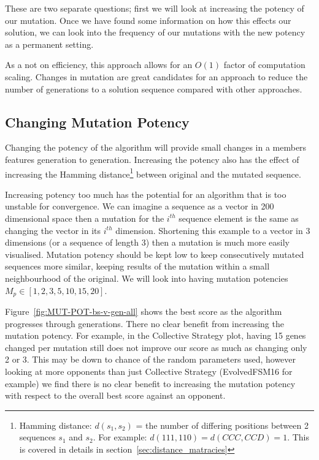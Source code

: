 These are two separate questions; first we will look at increasing the potency of our mutation.
Once we have found some information on how this effects our solution, we can look into the frequency of our mutations with the new potency as a permanent setting.

As a not on efficiency, this approach allows for an \(O(1)\) factor of computation scaling.
Changes in mutation are great candidates for an approach to reduce the number of generations to a solution sequence compared with other approaches.

\subsection{Changing Mutation Potency}\label{subsec:changingMutationPotency}
Changing the potency of the algorithm will provide small changes in a members features generation to generation.
Increasing the potency also has the effect of increasing the Hamming distance\footnote{Hamming distance: \(d(s_1,s_2)\) = the number of differing positions between 2 sequences \(s_1\) and \(s_2\).
For example: \(d(111,110) = d(CCC,CCD) = 1 \). This is covered in details in section~\ref{sec:distance_matracies}} between original and the mutated sequence.
 
Increasing potency too much has the potential for an algorithm that is too unstable for convergence. 
We can imagine a sequence as a vector in 200 dimensional space then a mutation for the \(i^{th}\) sequence element is the same as changing the vector in its \(i^{th}\) dimension.
Shortening this example to a vector in 3 dimensions (or a sequence of length 3) then a mutation is much more easily visualised.
Mutation potency should be kept low to keep consecutively mutated sequences more similar, keeping results of the mutation within a small neighbourhood of the original.
We will look into having mutation potencies \(M_p \in [1,2,3,5,10,15,20]\).

Figure~\ref{fig:MUT-POT-bs-v-gen-all} shows the best score as the algorithm progresses through generations.
There no clear benefit from increasing the mutation potency.
For example, in the Collective Strategy plot, having 15 genes changed per mutation still does not improve our score as much as changing only 2 or 3.
This may be down to chance of the random parameters used, however looking at more opponents than just Collective Strategy (EvolvedFSM16 for example) we find there is no clear benefit to increasing the mutation potency with respect to the overall best score against an opponent.

